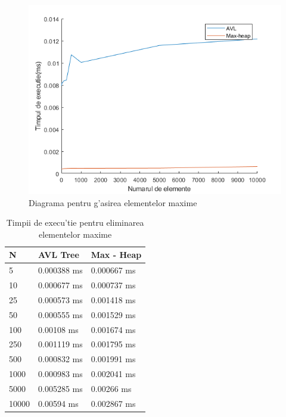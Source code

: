 \begin{figure}[ht]
\centering
\includegraphics[scale=0.8]{Fisiere/FindMax}
\caption {Diagrama pentru g'asirea elementelor maxime}
\end{figure}
\FloatBarrier

\vspace{5 mm}
\begin{table}[ht]
\centering
\caption{Timpii de execu'tie pentru eliminarea elementelor maxime}
\begin{tabular}{| p{5cm} | p{5cm} | p{5cm} |}
\hline
N & AVL Tree & Max - Heap \\
\hline\hline
5 & 0.000388 ms & 0.000667 ms \\
\hline
10 & 0.000677 ms & 0.000737 ms \\
\hline
25 & 0.000573 ms & 0.001418 ms \\
\hline
50 & 0.000555 ms & 0.001529 ms \\
\hline
100 & 0.00108 ms & 0.001674 ms \\
\hline
250 & 0.001119 ms & 0.001795 ms \\
\hline
500 & 0.000832 ms & 0.001991 ms \\
\hline
1000 & 0.000983 ms & 0.002041 ms \\
\hline
5000 & 0.005285 ms & 0.00266 ms \\
\hline
10000 & 0.00594 ms & 0.002867 ms \\
\hline
\end{tabular}
\end{table}
\FloatBarrier

